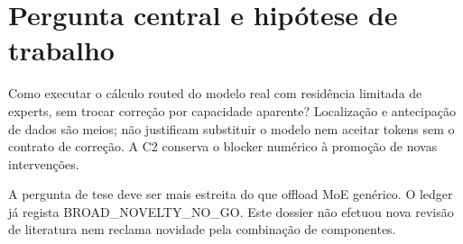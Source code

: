\clearpage
\section{Pergunta central e hipótese de trabalho}
Como executar o cálculo routed do modelo real com residência limitada de experts, sem trocar correção por capacidade aparente? Localização e antecipação de dados são meios; não justificam substituir o modelo nem aceitar tokens sem o contrato de correção. A C2 conserva o blocker numérico à promoção de novas intervenções. 


A pergunta de tese deve ser mais estreita do que offload MoE genérico. O ledger já regista BROAD\_NOVELTY\_NO\_GO. Este dossier não efetuou nova revisão de literatura nem reclama novidade pela combinação de componentes. 
